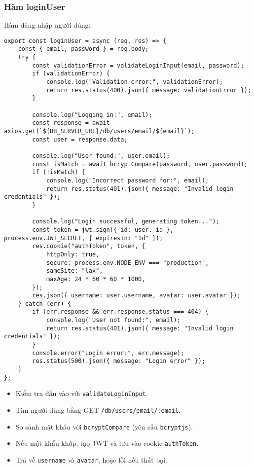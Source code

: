             \subsubsection{Hàm loginUser}
                \hspace*{0.6cm}Hàm đăng nhập người dùng:
                \begin{lstlisting}
export const loginUser = async (req, res) => {
    const { email, password } = req.body;
    try {
        const validationError = validateLoginInput(email, password);
        if (validationError) {
            console.log("Validation error:", validationError);
            return res.status(400).json({ message: validationError });
        }

        console.log("Logging in:", email);
        const response = await axios.get(`${DB_SERVER_URL}/db/users/email/${email}`);
        const user = response.data;

        console.log("User found:", user.email);
        const isMatch = await bcryptCompare(password, user.password);
        if (!isMatch) {
            console.log("Incorrect password for:", email);
            return res.status(401).json({ message: "Invalid login credentials" });
        }

        console.log("Login successful, generating token...");
        const token = jwt.sign({ id: user._id }, process.env.JWT_SECRET, { expiresIn: "1d" });
        res.cookie("authToken", token, {
            httpOnly: true,
            secure: process.env.NODE_ENV === "production",
            sameSite: "lax",
            maxAge: 24 * 60 * 60 * 1000,
        });
        res.json({ username: user.username, avatar: user.avatar });
    } catch (err) {
        if (err.response && err.response.status === 404) {
            console.log("User not found:", email);
            return res.status(401).json({ message: "Invalid login credentials" });
        }
        console.error("Login error:", err.message);
        res.status(500).json({ message: "Login error" });
    }
};
                \end{lstlisting}
                \begin{itemize}
                    \item Kiểm tra đầu vào với \texttt{validateLoginInput}.
                    \item Tìm người dùng bằng GET \texttt{/db/users/email/:email}.
                    \item So sánh mật khẩu với \texttt{bcryptCompare} (yêu cầu \texttt{bcryptjs}).
                    \item Nếu mật khẩu khớp, tạo JWT và lưu vào cookie \texttt{authToken}.
                    \item Trả về \texttt{username} và \texttt{avatar}, hoặc lỗi nếu thất bại.
                \end{itemize}

